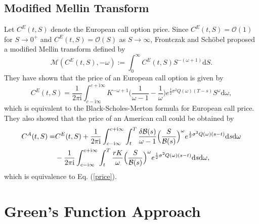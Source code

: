 \documentclass[fleqn,final,3p,11pt]{elsarticle}
\theoremstyle{definition}
\theoremstyle{remark}
\numberwithin{equation}{section}
\def\im{\mathrm{i}}
\begin{document}
\begin{appendices}
\subsection{Modified Mellin Transform} Let $C^{E}(t,S)$ denote the European call option price. Since $C^{E}(t,S)= \mathcal{O}(1)$ for $S\rightarrow 0^{+}$ and $C^{E}(t,S)= \mathcal{O}(S)$ as $S\rightarrow\infty$, Frontczak and Sch\"{o}bel \cite{patrik2}  proposed  a modified Mellin transform defined by
\[\mathcal{M}(C^{E}(t,S), -\omega):=\int_{0}^{\infty}C^{E}(t,S) S^{-(\omega +1)}\mathrm{d}S. \]
They have shown that the price of an European call option is given by
\[C^{E}(t,S)=\frac{1}{2\pi \im}\int_{c-\im \infty}^{c+ \im \infty}K^{-\omega +1}\Big(\frac{1}{\omega-1}-\frac{1}{\omega}\Big)e^{\frac{1}{2}\sigma^{2}Q(\omega)(T-s)}S^{\omega}\mathrm{d}\omega,\]
which is equivalent to the Black-Scholes-Merton formula for European call price. They also showed that the price of an American call could be obtained by
\begin{align}
C^{A}(t,S) =& C^{E}(t,S)+ \frac{1}{2\pi \im}\int_{c-\im \infty}^{c+\im \infty}\int_{t}^{T} \frac{\delta \mathcal{B}(s)}{\omega -1}\Big(\frac{S}{\mathcal{B}(s)}\Big)^{\omega}e^{\frac{1}{2}\sigma^{2}Q(\omega)(s-t)}\mathrm{d}s\mathrm{d}\omega\\
&-\frac{1}{2\pi \im}\int_{c-\im \infty}^{c+\im \infty}\int_{t}^{T} \frac{rK}{\omega}\Big( \frac{S}{\mathcal{B}(s)}\Big)^{\omega} e^{\frac{1}{2}\sigma^{2}Q(\omega)(s-t)}\mathrm{d}s\mathrm{d}\omega,\notag
\end{align}
which is equivalence to Eq. (\ref{price}).
\section{Green's Function Approach}\label{green1}

\end{appendices}
\end{document}

